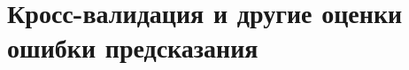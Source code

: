 \documentclass[12pt,a4paper,final]{report}
\begin{document}
\setcounter{chapter}{16}
\chapter{Кросс-валидация и другие оценки ошибки предсказания}








\newpage
\end{document}

